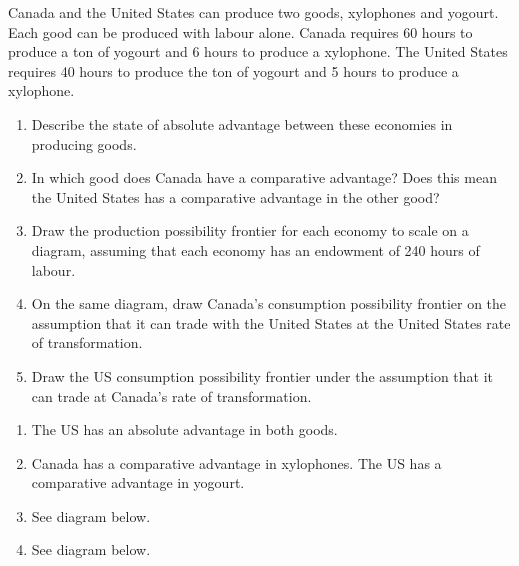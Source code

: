 \begin{enumialphparenastyle}
\begin{ex}\label{ex:ch15ex2}
Canada and the United States can produce two goods, xylophones and yogourt. Each good can be produced with labour alone. Canada requires 60 hours to produce a ton of yogourt and 6 hours to produce a xylophone. The United States requires 40 hours to produce the ton of yogourt and 5 hours to produce a xylophone.
\begin{enumerate}
\item  Describe the state of absolute advantage between these economies in producing goods.
\item  In which good does Canada have a comparative advantage? Does this mean the United States has a comparative advantage in the other good?
\item  Draw the production possibility frontier for each economy to scale on a diagram, assuming that each economy has an endowment of 240 hours of labour.
\item  On the same diagram, draw Canada's consumption possibility frontier on the assumption that it can trade with the United States at the United States rate of transformation. 
\item  Draw the US consumption possibility frontier under the assumption that it can trade at Canada's rate of transformation.
\end{enumerate}
\begin{sol}
\begin{enumerate}
	\item	The US has an absolute advantage in both goods.
	\item	Canada has a comparative advantage in xylophones. The US has a comparative advantage in yogourt.
	\item	See diagram below.
	\item	See diagram below.
\end{enumerate}
\begin{center}
\end{center}
\end{sol}
\end{ex}
\end{enumialphparenastyle}
